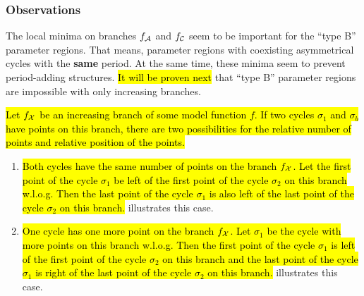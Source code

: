 \subsubsection{Observations}

The local minima on branches $f_{\mathcal{A}}$ and $f_{\mathcal{C}}$ seem to be important for the ``type B'' parameter regions.
That means, parameter regions with coexisting asymmetrical cycles with the \textbf{same} period.
At the same time, these minima seem to prevent period-adding structures.
\hl{It will be proven next} that ``type B'' parameter regions are impossible with only increasing branches.

\begin{lemma}
	\hl{
		Let $f_{\mathcal{X}}$ be an increasing branch of some model function $f$.
		If two cycles $\sigma_1$ and $\sigma_b$ have points on this branch, there are two possibilities for the relative number of points and relative position of the points.
	}
	\begin{enumerate}
		\item
		      \hl{
			      Both cycles have the same number of points on the branch $f_{\mathcal{X}}$.
			      Let the first point of the cycle $\sigma_1$ be left of the first point of the cycle $\sigma_2$ on this branch w.l.o.g.
			      Then the last point of the cycle $\sigma_1$ is also left of the last point of the cycle $\sigma_2$ on this branch.
		      }
		       illustrates this case.
		\item
		      \hl{
			      One cycle has one more point on the branch $f_{\mathcal{X}}$.
			      Let $\sigma_1$ be the cycle with more points on this branch w.l.o.g.
			      Then the first point of the cycle $\sigma_1$ is left of the first point of the cycle $\sigma_2$ on this branch and the last point of the cycle $\sigma_1$ is right of the last point of the cycle $\sigma_2$ on this branch.
		      }
		       illustrates this case.
	\end{enumerate}
	\label{lemma:add.num.pos.points.increasing}
\end{lemma}

